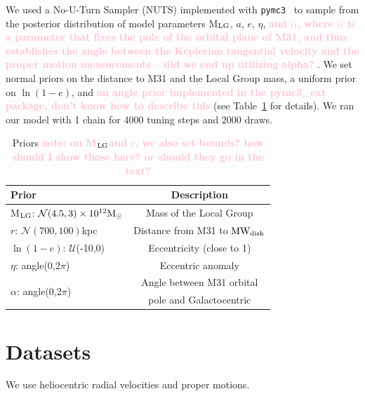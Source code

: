\documentclass[twocolumn]{aastex631}
\newcommand{\mlg}{M$_{\rm LG}$}
\newcommand{\kc}[1]{\textcolor{pink}{\textbf{#1}} }
\newcommand{\mwdisk}{\rm MW_{disk}}
\begin{document}
We used a No-U-Turn Sampler (NUTS) implemented with \texttt{pymc3}~\citep{Salvatier2016} to sample from the posterior distribution of model parameters \mlg, $a$, $e$, $\eta$, \kc{and $\alpha$, where $\alpha$ is a parameter that fixes the pole of the orbital plane of M31, and thus establishes the angle between the Keplerian tangential velocity and the proper motion measurements -- did we end up utilizing alpha?}. We set normal priors on the distance to M31 and the Local Group mass, a uniform prior on $\ln(1-e)$, and \kc{an angle prior implemented in the pymc3\_ext package, don't know how to describe this} (see Table~\ref{table:priors} for details). We ran our model with 1 chain for 4000 tuning steps and 2000 draws. 





\begin{table}
  \centering
  \begin{tabular}{lc}
  \hline\hline
  Prior  & Description \\\hline
  \mlg: $\mathcal{N}(4.5,3)\times10^{12}\mathrm{M}_\odot$ & Mass of the Local Group\\
  $r$: $\mathcal{N}(700,100)$kpc & Distance from M31 to $\mwdisk$\\
  $\ln(1-e)$: $\mathcal{U}$(-10,0) & Eccentricity (close to 1) \\
  $\eta$: angle(0,2$\pi$)& Eccentric anomaly\\
  \multirow{2}{*}{$\alpha$: angle(0,2$\pi$)} & Angle between M31 orbital\\
  & pole and Galactocentric\\
  \hline\hline
  \end{tabular}
  \caption{\label{table:priors}Priors \kc{note: on \mlg and $r$, we also set bounds? how should I show those here? or should they go in the text?}}
\end{table}




\section{Datasets}
We use heliocentric radial velocities and proper motions. 
\end{document}
